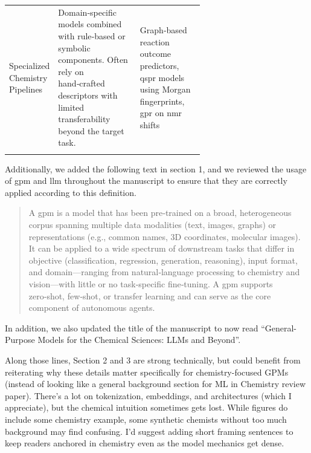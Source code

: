 \begin{reply}
\begin{table}[H]
\begin{tabularx}{\linewidth}{@{}p{0.22\linewidth} p{0.42\linewidth} X@{}}
        \addlinespace[0.8em]
        \midrule
        \addlinespace[0.3em]
        
        Specialized Chemistry Pipelines &
        Domain‑specific models combined with rule‑based or symbolic components. Often rely on hand‑crafted descriptors with limited transferability beyond the target task. &
        Graph‑based reaction outcome predictors,  \gls{qspr} models using Morgan fingerprints, \gls{gpr} on \gls{nmr} shifts \\
        
        \addlinespace[0.3em]
        \bottomrule
    \end{tabularx}
\end{table}

Additionally, we added the following text in section 1, and we reviewed the usage of \gls{gpm} and \gls{llm} throughout the manuscript to ensure that they are correctly applied according to this definition. 
\begin{quote}
A \gls{gpm} is a model that has been pre‑trained on a broad, heterogeneous corpus spanning multiple data modalities (text, images, graphs) or representations (e.g., common names, 3D coordinates, molecular images).
It can be applied to a wide spectrum of downstream tasks that differ in objective (classification, regression, generation, reasoning), input format, and domain---ranging from natural‑language processing to chemistry and vision---with little or no task‑specific fine‑tuning.
A \gls{gpm} supports zero‑shot, few‑shot, or transfer learning and can serve as the core component of autonomous agents.
\end{quote}

In addition, we also updated the title of the manuscript to now read \enquote{General-Purpose Models for the Chemical Sciences:
LLMs and Beyond}.
\end{reply}

\begin{point}
Along those lines, Section 2 and 3 are strong technically, but could benefit from reiterating why these details matter specifically for chemistry-focused GPMs (instead of looking like a general background section for ML in Chemistry review paper). There's a lot on tokenization, embeddings, and architectures (which I appreciate), but the chemical intuition sometimes gets lost. While figures do include some chemistry example, some synthetic chemists without too much background may find confusing. I'd suggest adding short framing sentences to keep readers anchored in chemistry even as the model mechanics get dense.
\end{point}


